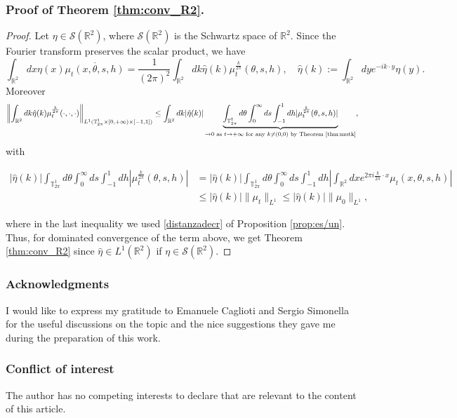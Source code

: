 \documentclass[a4paper,10pt,reqno]{amsart}
\numberwithin{equation}{subsection}
\numberwithin{figure}{subsection}
\begin{document}
\subsubsection{\textbf{Proof of Theorem \ref{thm:conv_R2}.}}
\begin{proof} Let $\eta\in{\mathcal S}(\mathbb{R}^2)$, where ${\mathcal S}(\mathbb{R}^2)$ is the Schwartz space of $\mathbb{R}^2$. Since the Fourier transform preserves the scalar product, we have
\[
\int_{\mathbb{R}^2}dx\eta(x)\overline{\mu_t(x,\theta,s,h)}=\frac{1}{(2\pi)^2}\int_{\mathbb{R}^2}dk\hat\eta(k)\mu_t^{\frac{k}{2\pi}}(\theta,s,h),\quad\hat \eta(k):=\int_{\mathbb{R}^2}dye^{-ik\cdot y}\eta(y).
\]
Moreover
{\scriptsize\[
\left\|\int_{\mathbb{R}^2}dk\hat \eta(k)\mu_t^{\frac{k}{2\pi}}(\cdot,\cdot,\cdot)\right\|_{L^1(\mathbb{T}^1_{2\pi}\times[0,+\infty)\times[-1,1])}\leq\int_{\mathbb{R}^2}dk|\hat \eta(k)|\underbrace{\int_{\mathbb{T}^1_{2\pi}}d\theta\int_0^{\infty}ds\int_{-1}^1dh|\mu_t^{\frac{k}{2\pi}}(\theta,s,h)|}_{\to0\textrm{ as }t\to+\infty\textrm{ for any }k\neq(0,0)\textrm{ by Theorem \ref{thm:mutk}}},
\]}
with

{\scriptsize\begin{align*}
|\hat \eta(k)|\int_{\mathbb{T}^1_{2\pi}}d\theta\int_0^{\infty}ds\int_{-1}^1dh|\mu_t^{\frac{k}{2\pi}}(\theta,s,h)|&=|\hat \eta(k)|\int_{\mathbb{T}^1_{2\pi}}d\theta\int_0^{\infty}ds\int_{-1}^1dh\left|\int_{\mathbb{R}^2}dxe^{2\pi i\frac{k}{2\pi}\cdot x}\mu_t(x,\theta,s,h)\right|
\\
&\leq|\hat \eta(k)|\|\mu_t\|_{L^1}\leq|\hat \eta(k)|\|\mu_0\|_{L^1},
\end{align*}}

where in the last inequality we used \eqref{distanzadecr} of Proposition \ref{prop:es/un}. Thus, for dominated convergence of the term above, we get Theorem \ref{thm:conv_R2} since $\hat \eta\in L^1(\mathbb{R}^2)$ if $\eta\in{\mathcal S}(\mathbb{R}^2)$.
\end{proof}

\subsubsection{Acknowledgments} I would like to express my gratitude to Emanuele Caglioti and Sergio Simonella for the useful discussions on the topic and the nice suggestions they gave me during the preparation of this work.
\newline
\subsubsection{Conflict of interest} The author has no competing interests to declare that are relevant to the content of this article.
\end{document}
